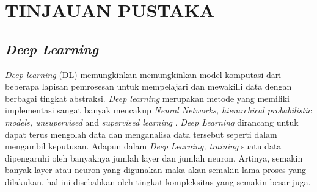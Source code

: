 \section{TINJAUAN PUSTAKA}

\subsection{\textit{Deep Learning}}
\textit{Deep learning} (DL) memungkinkan memungkinkan model komputasi dari beberapa lapisan pemrosesan untuk mempelajari dan mewakilli data dengan berbagai tingkat abstraksi. \textit{Deep learning} merupakan metode yang memiliki implementasi sangat banyak mencakup \textit{Neural Networks, hierarchical probabilistic models, unsupervised} and \textit{supervised learning} \citep*{voulodimos2018deep}. \textit{Deep Learning} dirancang untuk dapat terus mengolah data dan menganalisa data tersebut seperti dalam mengambil keputusan. Adapun dalam \textit{Deep Learning, training} suatu data dipengaruhi oleh banyaknya jumlah layer dan jumlah neuron. Artinya, semakin banyak layer atau neuron yang digunakan maka akan semakin lama proses yang dilakukan, hal ini disebabkan oleh tingkat kompleksitas yang semakin besar juga.



